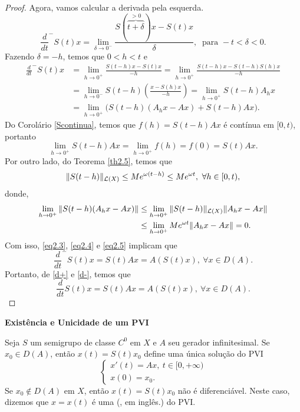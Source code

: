 \begin{proof}
Agora, vamos calcular a derivada pela esquerda.
\[
\frac{d}{dt}^- S(t)x = \lim_{\delta \to 0^-} \frac{S(\overbrace{t+\delta}^{>0})x - S(t)x}{\delta}, \ \text{ para } -t < \delta < 0.
\]
Fazendo $\delta=-h$, temos que $0<h<t$ e 
\begin{equation}\label{eq2.3}
\begin{split}
    \frac{d}{dt}^- S(t)x 
    & = \lim_{h \to 0^+} \frac{S(t-h)x - S(t)x}{-h}=
    \lim_{h \to 0^+} \frac{S(t-h)x - S(t-h)S(h)x}{-h}\\
    &=  \lim_{h \to 0^-} S(t-h)\left(\frac{x - S(h)x}{-h}\right)
    =\lim_{h \to 0^+} S(t-h)A_hx\\
    &= \lim_{h \to 0^+} \Big(S(t-h)(A_hx-Ax)+S(t-h)Ax\Big).
\end{split}
\end{equation}
Do Corolário \eqref{Scontinua}, temos que $f(h)=S(t-h)Ax$ é contínua em $[0,t)$, portanto
\begin{equation}\label{eq2.4}
\lim_{h \to 0^+} S(t-h)Ax=\lim_{h \to 0^+}f(h)=f(0)=S(t)Ax.
\end{equation}
Por outro lado, do Teorema \ref{th2.5}, temos que
\[\|S(t-h)\|_{\mathcal{L}(X)}\leq Me^{\omega(t-h)}\leq Me^{\omega t},\ \forall h\in [0,t),\]
donde,
\begin{equation}\label{eq2.5}
\begin{split}
 \lim_{h \to 0^+}\|S(t-h)(A_hx-Ax)\|
 & \leq \lim_{h \to 0^+}\|S(t-h)\|_{\mathcal{L}(X)}\|A_hx-Ax\|\\
 & \leq \lim_{h \to 0^+}Me^{\omega t}\|A_hx-Ax\|=0.
\end{split}
\end{equation}
Com isso, \eqref{eq2.3}, \eqref{eq2.4} e \eqref{eq2.5} implicam que 
\begin{equation}\label{d-}
\frac{d}{dt}^-S(t)x=S(t)Ax=A(S(t)x),\ \forall x\in D(A).    
\end{equation}
Portanto, de \eqref{d+} e \eqref{d-}, temos que
\begin{equation*}
\frac{d}{dt}S(t)x=S(t)Ax=A(S(t)x),\ \forall x\in D(A).    
\end{equation*}
\end{proof}


\begin{example} \textbf{Existência e Unicidade de um PVI}

Seja $S$ um semigrupo de classe $C^0$ em $X$ e $A$ seu gerador infinitesimal. Se {$x_0\in D(A)$}, então $x(t)=S(t)x_0$ define {uma única solução} do PVI
\[
\begin{cases}
    x'(t)=Ax,\ t\in [0,+\infty)\\
    x(0)=x_0.
\end{cases}
\]
Se {$x_0\not\in D(A)$} em $X$, então $x(t)=S(t)x_0$ {\color{red}não é diferenciável}. Neste caso, dizemos que $x=x(t)$ é uma  (, em inglês.)  do PVI.
\end{example}


